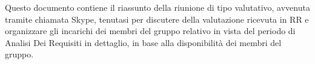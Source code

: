 Questo documento contiene il riassunto della riunione di tipo valutativo, avvenuta tramite chiamata Skype, tenutasi per discutere della valutazione ricevuta in RR e organizzare gli incarichi dei membri del gruppo relativo in vista del periodo di Analisi Dei Requisiti in dettaglio, in base alla disponibilità dei membri del gruppo.

